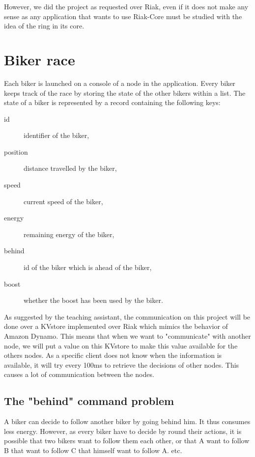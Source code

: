 \documentclass[a4paper, 11pt]{article}
\begin{document}
However, we did the project as requested over Riak, even if it does not make any sense as any application that wants to use Riak-Core must be studied with the idea of the ring in its core. \\

\section{Biker race}

Each biker is launched on a console of a node in the application.
Every biker keeps track of the race by storing the state of the other bikers within a list.
The state of a biker is represented by a record containing the following keys:
\begin{description}
	\item[id] identifier of the biker,
	\item[position] distance travelled by the biker,
	\item[speed] current speed of the biker,
	\item[energy] remaining energy of the biker,
	\item[behind] id of the biker which is ahead of the biker,
	\item[boost] whether the boost has been used by the biker.
\end{description}

As suggested by the teaching assistant, the communication on this project will be done over a KVstore implemented over Riak which mimics the behavior of Amazon Dynamo.
This means that when we want to "communicate" with another node, we will put a value on this KVstore to make this value available for the others nodes.
As a specific client does not know when the information is available, it will try every 100ms to retrieve the decisions of other nodes.
This causes a lot of communication between the nodes. \\

\subsection{The "behind" command problem}

A biker can decide to follow another biker by going behind him. It thus consumes less energy. However, as every biker have to decide by round their actions, it is possible that two bikers want to follow them each other, or that A want to follow B that want to follow C that himself want to follow A. etc. \\
\end{document}
